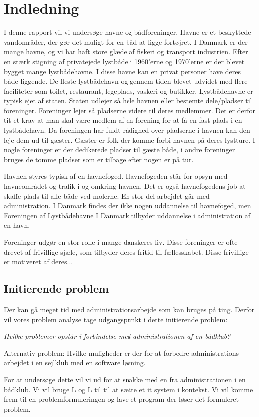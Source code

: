 \chapter{Indledning}
I denne rapport vil vi undersøge havne og bådforeninger. Havne er et beskyttede vandområder, der gør det muligt for en båd at ligge fortøjret. I Danmark er der mange havne, og vi har haft store glæde af fiskeri og transport industrien. Efter en stærk stigning af privatejede lystbåde i 1960'erne og 1970'erne er der blevet bygget mange lystbådehavne. I disse havne kan en privat personer have deres både liggende. De fleste lystbådehavn og gennem tiden blevet udvidet med flere faciliteter som toilet, restaurant, legeplads, vaskeri og butikker. Lystbådehavne er   typisk ejet af staten. Staten udlejer så hele havnen eller bestemte dele/pladser til foreninger. Foreninger lejer så pladserne videre til deres medlemmer. Det er derfor tit et krav at man skal være medlem af en forening for at få en fast plads i en lystbådehavn. Da foreningen har fuldt rådighed over pladserne i havnen kan den leje dem ud til gæster. Gæster er folk der komme forbi havnen på deres lystture. I nogle foreninger er der dedikerede pladser til gæste både, i andre foreninger bruges de tomme pladser som er tilbage efter nogen er på tur.  

Havnen styres typisk af en havnefoged. Havnefogeden står for opsyn med havneområdet og trafik i og omkring havnen. Det er også havnefogedens job at skaffe plads til alle både ved molerne. En stor del arbejdet går med administration. I Danmark findes der ikke nogen uddannelse til havnefoged, men Foreningen af Lystbådehavne I Danmark tilbyder uddannelse i administration af en havn.

Foreninger udgør en stor rolle i mange danskeres liv. Disse foreninger er ofte drevet af frivillige sjæle, som tilbyder deres fritid til fællesskabet. Disse frivillige er motiveret af deres...

\section{Initierende problem}

Der kan gå meget tid med administrationsarbejde som kan bruges på ting. Derfor vil vores problem analyse tage udgangspunkt i dette initierende problem:

\textit{Hvilke problemer opstår i forbindelse med administrationen af en bådklub?}

Alternativ problem:
Hvilke muligheder er der for at forbedre administrations arbejdet i en sejlklub med en software løsning.

For at undersøge dette vil vi ud for at snakke med en fra administrationen i en bådklub. Vi vil bruge L og L til til at sætte et it system i kontekst. Vi vil komme frem til en problemformuleringen og lave et program der løser det formuleret problem.
